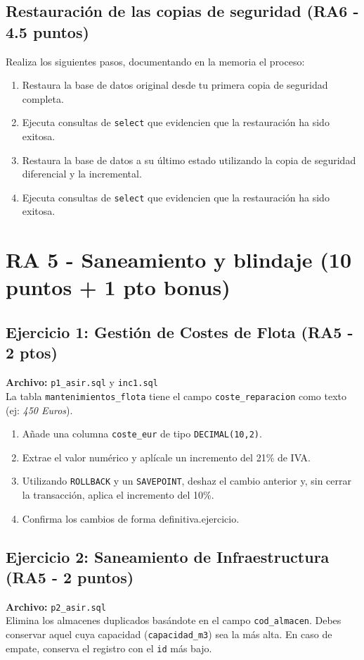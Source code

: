 \documentclass[12pt,a4paper]{article}
\begin{document}
\subsection{Restauración de las copias de seguridad \textcolor{RA6}{(RA6 - 4.5 puntos)}}
Realiza los siguientes pasos, documentando en la memoria el proceso:
\begin{enumerate}
    \item Restaura la base de datos original desde tu primera copia de seguridad completa.
    \item Ejecuta consultas de \texttt{select} que evidencien que la restauración ha sido exitosa.
    \item Restaura la base de datos a su último estado utilizando la copia de seguridad diferencial y la incremental.
    \item Ejecuta consultas de \texttt{select} que evidencien que la restauración ha sido exitosa.
\end{enumerate}




\section{RA 5 - Saneamiento y blindaje (10 puntos + 1 pto bonus)}


\subsection{Ejercicio 1: Gestión de Costes de Flota \textcolor{RA5}{(RA5 - 2 ptos)}}
\textbf{Archivo:} \texttt{p1\_asir.sql} y \texttt{inc1.sql} \\
La tabla \texttt{mantenimientos\_flota} tiene el campo \texttt{coste\_reparacion} como texto (ej: \textit{450 Euros}).
\begin{enumerate}
    \item Añade una columna \texttt{coste\_eur} de tipo \texttt{DECIMAL(10,2)}.
    \item Extrae el valor numérico y aplícale un incremento del 21\% de IVA.
    \item Utilizando \texttt{ROLLBACK} y un \texttt{SAVEPOINT}, deshaz el cambio anterior y, sin cerrar la transacción, aplica el incremento del 10\%.
    \item Confirma los cambios de forma definitiva.ejercicio.
\end{enumerate}



\subsection{Ejercicio 2: Saneamiento de Infraestructura \textcolor{RA5}{(RA5 - 2 puntos)}}
\textbf{Archivo:} \texttt{p2\_asir.sql} \\
Elimina los almacenes duplicados basándote en el campo \texttt{cod\_almacen}. Debes conservar aquel cuya capacidad (\texttt{capacidad\_m3}) sea la más alta. En caso de empate, conserva el registro con el \texttt{id} más bajo.
\end{document}
